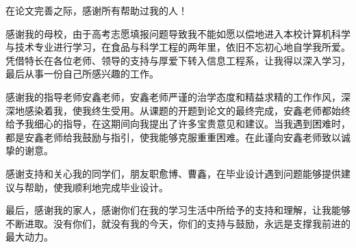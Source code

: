 \documentclass[a4paper]{ltxdoc}
\begin{document}
\begin{acknowledge}
	在论文完善之际，感谢所有帮助过我的人！

	感谢我的母校，由于高考志愿填报问题导致我不能如愿以偿地进入本校计算机科学与技术专业进行学习，在食品与科学工程的两年里，依旧不忘初心地自学我所爱。凭借特长在各位老师、领导的支持与厚爱下转入信息工程系，让我得以深入学习，最后从事一份自己所感兴趣的工作。

	感谢我的指导老师安鑫老师，安鑫老师严谨的治学态度和精益求精的工作作风，深深地感染着我，使我终生受用。从课题的开题到论文的最终完成，安鑫老师都始终给予我细心的指导，在这期间向我提出了许多宝贵意见和建议。当我遇到困难时，都是安鑫老师给我鼓励与指引，使我能够克服重重困难。在此谨向安鑫老师致以诚挚的谢意。

	感谢支持和关心我的同学们，朋友职愈博、曹鑫，在毕业设计遇到问题能够提供建议与帮助，使我顺利地完成毕业设计。

	最后，感谢我的家人，感谢你们在我的学习生活中所给予的支持和理解，让我能够不断进取。没有你们，就没有我的今天，你们的支持与鼓励，永远是支撑我前进的最大动力。
\end{acknowledge}

\end{document}
